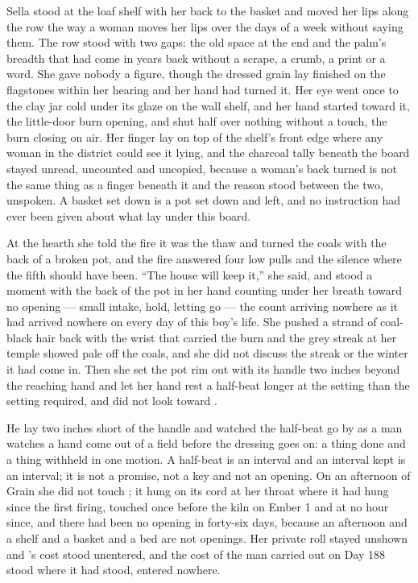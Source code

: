 \scenebreak

Sella stood at the loaf shelf with her back to the basket and moved her lips along the row the way a woman moves her lips over the days of a week without saying them. The row stood with two gaps: the old space at the end and the palm's breadth that had come in years back without a scrape, a crumb, a print or a word. She gave nobody a figure, though the dressed grain lay finished on the flagstones within her hearing and her hand had turned it. Her eye went once to the clay jar cold under its glaze on the wall shelf, and her hand started toward it, the little-door burn opening, and shut half over nothing without a touch, the burn closing on air. Her finger lay on top of the shelf's front edge where any woman in the district could see it lying, and the charcoal tally beneath the board stayed unread, uncounted and uncopied, because a woman's back turned is not the same thing as a finger beneath it and the reason stood between the two, unspoken. A basket set down is a pot set down and left, and no instruction had ever been given about what lay under this board.

At the hearth she told the fire it was the thaw and turned the coals with the back of a broken pot, and the fire answered four low pulls and the silence where the fifth should have been. “The house will keep it,” she said, and stood a moment with the back of the pot in her hand counting under her breath toward no opening --- small intake, hold, letting go --- the count arriving nowhere as it had arrived nowhere on every day of this boy's life. She pushed a strand of coal-black hair back with the wrist that carried the burn and the grey streak at her temple showed pale off the coals, and she did not discuss the streak or the winter it had come in. Then she set the pot rim out with its handle two inches beyond the reaching hand and let her hand rest a half-beat longer at the setting than the setting required, and did not look toward .

He lay two inches short of the handle and watched the half-beat go by as a man watches a hand come out of a field before the dressing goes on: a thing done and a thing withheld in one motion. A half-beat is an interval and an interval kept is an interval; it is not a promise, not a key and not an opening. On an afternoon of Grain she did not touch ; it hung on its cord at her throat where it had hung since the first firing, touched once before the kiln on Ember 1 and at no hour since, and there had been no opening in forty-six days, because an afternoon and a shelf and a basket and a bed are not openings. Her private roll stayed unshown and 's cost stood unentered, and the cost of the man carried out on Day 188 stood where it had stood, entered nowhere.

